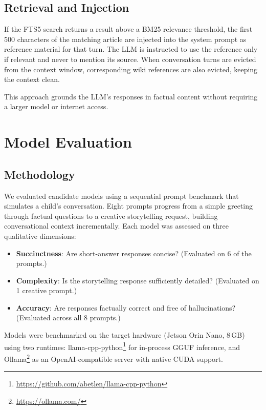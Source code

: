 \documentclass[11pt]{article}
\begin{document}
\subsection{Retrieval and Injection}

If the FTS5 search returns a result above a BM25 relevance threshold, the first 500 characters of the matching article are injected into the system prompt as reference material for that turn.
The LLM is instructed to use the reference only if relevant and never to mention its source.
When conversation turns are evicted from the context window, corresponding wiki references are also evicted, keeping the context clean.

This approach grounds the LLM's responses in factual content without requiring a larger model or internet access.

\section{Model Evaluation}

\subsection{Methodology}

We evaluated candidate models using a sequential prompt benchmark that simulates a child's conversation.
Eight prompts progress from a simple greeting through factual questions to a creative storytelling request, building conversational context incrementally.
Each model was assessed on three qualitative dimensions:

\begin{itemize}[nosep]
  \item \textbf{Succinctness}: Are short-answer responses concise? (Evaluated on 6 of the prompts.)
  \item \textbf{Complexity}: Is the storytelling response sufficiently detailed? (Evaluated on 1 creative prompt.)
  \item \textbf{Accuracy}: Are responses factually correct and free of hallucinations? (Evaluated across all 8 prompts.)
\end{itemize}

\noindent Models were benchmarked on the target hardware (Jetson Orin Nano, 8\,GB) using two runtimes:
llama-cpp-python\footnote{\url{https://github.com/abetlen/llama-cpp-python}} for in-process GGUF inference, and
Ollama\footnote{\url{https://ollama.com/}} as an OpenAI-compatible server with native CUDA support.
\end{document}
